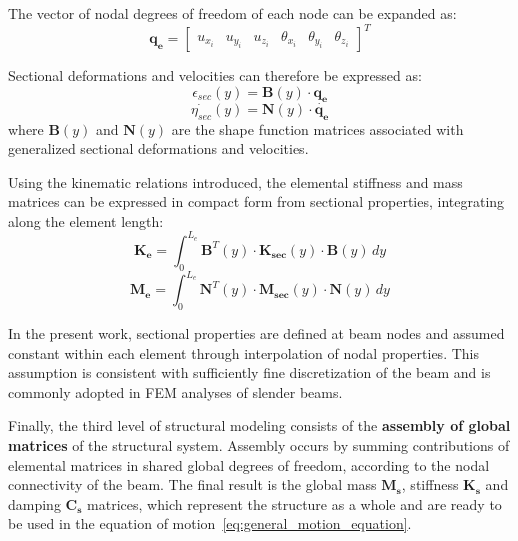 The vector of nodal degrees of freedom of each node can be expanded as:
\begin{equation}
    \mathbf{q_e} =
    \begin{bmatrix}
        u_{x_i} & u_{y_i} & u_{z_i} & \theta_{x_i} & \theta_{y_i} & \theta_{z_i}
    \end{bmatrix}^T
    \label{eq:nodal_dofs_expanded}
\end{equation}

Sectional deformations and velocities can therefore be expressed as:
\begin{equation}
    \epsilon_{sec}(y) = \mathbf{B}(y) \cdot \mathbf{q_e}
    \label{eq:strain_displacement_relation}
\end{equation}
\begin{equation}
    \dot{{\eta}_{sec}}(y) = \mathbf{N}(y) \cdot \dot{\mathbf{q_e}}
    \label{eq:velocity_displacement_relation}
\end{equation}
where $\mathbf{B}(y)$ and $\mathbf{N}(y)$ are the shape function matrices associated with generalized sectional deformations and velocities.

Using the kinematic relations introduced, the elemental stiffness and mass matrices can be expressed in compact form from sectional properties,
integrating along the element length:
\begin{equation}
    \mathbf{K_e} = \int_{0}^{L_e} \mathbf{B}^T(y) \cdot \mathbf{K_{sec}}(y) \cdot \mathbf{B}(y) \, dy
    \label{eq:elemental_stiffness_matrix}
\end{equation}
\begin{equation}
    \mathbf{M_e} = \int_{0}^{L_e} \mathbf{N}^T(y) \cdot \mathbf{M_{sec}}(y) \cdot \mathbf{N}(y) \, dy
    \label{eq:elemental_mass_matrix}
\end{equation}

In the present work, sectional properties are defined at beam nodes and assumed constant within each element through interpolation of nodal properties.
This assumption is consistent with sufficiently fine discretization of the beam and is commonly adopted in FEM analyses of slender beams.

Finally, the third level of structural modeling consists of the \textbf{assembly of global matrices} of the structural system.
Assembly occurs by summing contributions of elemental matrices in shared global degrees of freedom, according to the nodal connectivity of the beam.
The final result is the global mass $\mathbf{M_s}$, stiffness $\mathbf{K_s}$ and damping $\mathbf{C_s}$ matrices, which represent the structure as a whole
and are ready to be used in the equation of motion~\ref{eq:general_motion_equation}.

